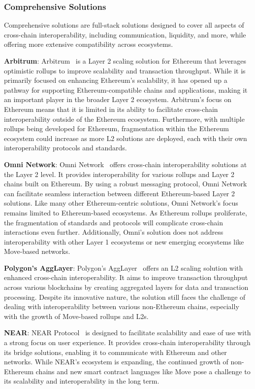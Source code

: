 \subsubsection{Comprehensive Solutions}

Comprehensive solutions are full-stack solutions designed to cover all aspects of cross-chain interoperability, including communication, liquidity, and more, while offering more extensive compatibility across ecosystems.

\textbf{Arbitrum}: Arbitrum~\cite{arbitrum} is a Layer 2 scaling solution for Ethereum that leverages optimistic rollups to improve scalability and transaction throughput. While it is primarily focused on enhancing Ethereum's scalability, it has opened up a pathway for supporting Ethereum-compatible chains and applications, making it an important player in the broader Layer 2 ecosystem. Arbitrum's focus on Ethereum means that it is limited in its ability to facilitate cross-chain interoperability outside of the Ethereum ecosystem. Furthermore, with multiple rollups being developed for Ethereum, fragmentation within the Ethereum ecosystem could increase as more L2 solutions are deployed, each with their own interoperability protocols and standards.

\textbf{Omni Network}: Omni Network~\cite{omni} offers cross-chain interoperability solutions at the Layer 2 level. It provides interoperability for various rollups and Layer 2 chains built on Ethereum. By using a robust messaging protocol, Omni Network can facilitate seamless interaction between different Ethereum-based Layer 2 solutions. Like many other Ethereum-centric solutions, Omni Network's focus remains limited to Ethereum-based ecosystems. As Ethereum rollups proliferate, the fragmentation of standards and protocols will complicate cross-chain interactions even further. Additionally, Omni's solution does not address interoperability with other Layer 1 ecosystems or new emerging ecosystems like Move-based networks.

\textbf{Polygon’s AggLayer}: Polygon’s AggLayer~\cite{aggglayer} offers an L2 scaling solution with enhanced cross-chain interoperability. It aims to improve transaction throughput across various blockchains by creating aggregated layers for data and transaction processing. Despite its innovative nature, the solution still faces the challenge of dealing with interoperability between various non-Ethereum chains, especially with the growth of Move-based rollups and L2s.

\textbf{NEAR}: NEAR Protocol~\cite{near} is designed to facilitate scalability and ease of use with a strong focus on user experience. It provides cross-chain interoperability through its bridge solutions, enabling it to communicate with Ethereum and other networks. While NEAR’s ecosystem is expanding, the continued growth of non-Ethereum chains and new smart contract languages like Move pose a challenge to its scalability and interoperability in the long term.


